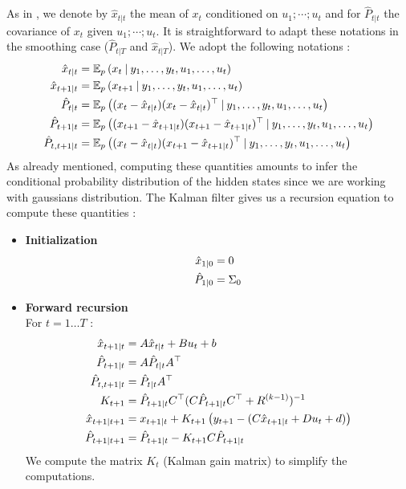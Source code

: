 As in \cite{Poly}, we denote by $\hat{x}_{t|t}$ the mean of $x_t$ conditioned on $u_1;\cdots;u_t$ and for $\hat{P}_{t|t}$ the covariance of $x_t$ given $u_1;\cdots;u_t$. It is straightforward to adapt these notations in the smoothing case ($\hat{P}_{t|T}$ and $\hat{x}_{t|T}$).
We adopt the following notations :
\begin{align*}
  \hat{x}_{t \mathbin{\vert} t} &= \mathbb{E}_p \left(x_t \mathbin{\vert} y_1, \ldots , y_t, u_1, \ldots , u_t \right) \\
  \hat{x}_{t+1 \mathbin{\vert} t} &= \mathbb{E}_p \left(x_{t+1} \mathbin{\vert} y_1, \ldots , y_t, u_1, \ldots , u_t \right) \\
  \hat{P}_{t \mathbin{\vert} t} &= \mathbb{E}_p \left((x_t - \hat{x}_{t \mathbin{\vert} t})(x_t - \hat{x}_{t \mathbin{\vert} t})^{\top} \mathbin{\vert} y_1, \ldots , y_t, u_1, \ldots , u_t \right) \\
  \hat{P}_{t+1 \mathbin{\vert} t} &= \mathbb{E}_p \left((x_{t+1} - \hat{x}_{t+1 \mathbin{\vert} t})(x_{t+1} - \hat{x}_{t+1 \mathbin{\vert} t})^{\top} \mathbin{\vert} y_1, \ldots , y_t, u_1, \ldots , u_t \right) \\
  \hat{P}_{t,t+1 \mathbin{\vert} t} &= \mathbb{E}_p \left((x_t - \hat{x}_{t \mathbin{\vert} t})(x_{t+1} - \hat{x}_{t+1 \mathbin{\vert} t})^{\top} \mathbin{\vert} y_1, \ldots , y_t, u_1, \ldots , u_t \right) \\
\end{align*}
As already mentioned, computing these quantities amounts to infer the conditional probability distribution of the hidden states since we are working with gaussians distribution. The Kalman filter gives us a recursion equation to compute these quantities :
\begin{itemize}
  \item \textbf{Initialization}\\
    \begin{align*}
      \hat{x}_{1 \mathbin{\vert} 0} &= 0\\
      \hat{P}_{1 \mathbin{\vert} 0} &= \Sigma_0\\
    \end{align*}
  \item \textbf{Forward recursion}\\
    For $t=1 \ldots T$ :
    \begin{align*}
      \hat{x}_{t+1 \mathbin{\vert} t} &= A \hat{x}_{t \mathbin{\vert} t} + B u_t + b\\
      \hat{P}_{t+1 \mathbin{\vert} t} &= A \hat{P}_{t \mathbin{\vert} t} A^{\top}\\
      \hat{P}_{t,t+1 \mathbin{\vert} t} &= \hat{P}_{t \mathbin{\vert} t}A^{\top}\\
      K_{t+1} &= \hat{P}_{t+1 \mathbin{\vert} t}C^{\top}(C \hat{P}_{t+1 \mathbin{\vert} t} C^{\top} + R^{(k-1)})^{-1}\\
      \hat{x}_{t+1 \mathbin{\vert} t+1} &= x_{t+1 \mathbin{\vert} t} + K_{t+1} \left(y_{t+1} - (C\hat{x}_{t+1 \mathbin{\vert} t} + D u_t + d) \right)\\
      \hat{P}_{t+1 \mathbin{\vert} t+1} &= \hat{P}_{t+1 \mathbin{\vert} t} - K_{t+1} C \hat{P}_{t+1 \mathbin{\vert} t}\\
    \end{align*}
We compute the matrix $K_{t}$ (Kalman gain matrix) to simplify the computations.
\end{itemize}

